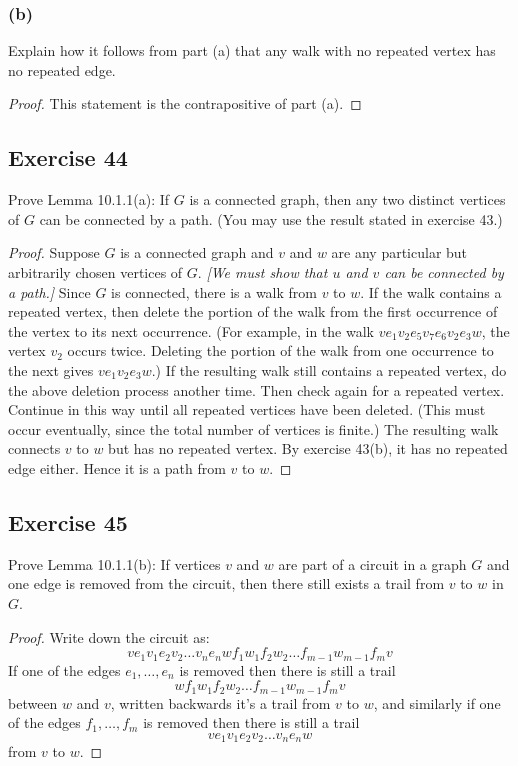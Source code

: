\documentclass[14pt]{extarticle}
\begin{document}
\subsubsection{(b)}
Explain how it follows from part (a) that any walk with no repeated vertex has no repeated edge.

\begin{proof}
    This statement is the contrapositive of part (a).
\end{proof}

\subsection{Exercise 44}
Prove Lemma 10.1.1(a): If \(G\) is a connected graph, then any two distinct vertices of \(G\) can be connected by a path.
(You may use the result stated in exercise 43.)

\begin{proof}
    Suppose \(G\) is a connected graph and \(v\) and \(w\) are any particular but arbitrarily chosen vertices of \(G\). {\it [We
                must show that \(u\) and \(v\) can be connected by a path.]} Since \(G\) is connected, there is a walk from \(v\) to \(w\).
    If the walk contains a repeated vertex, then delete the portion of the walk from the first occurrence of the vertex to
    its next occurrence. (For example, in the walk \(ve_1v_2e_5v_7e_6v_2e_3w\), the vertex \(v_2\) occurs twice.
    Deleting the portion of the walk from one occurrence to the next gives \(ve_1v_2e_3w\).) If the resulting walk still
    contains a repeated vertex, do the above deletion process another time. Then check again for a repeated vertex. Continue
    in this way until all repeated vertices have been deleted. (This must occur eventually, since the total number of
    vertices is finite.) The resulting walk connects \(v\) to \(w\) but has no repeated vertex. By exercise 43(b), it has no
    repeated edge either. Hence it is a path from \(v\) to \(w\).
\end{proof}

\subsection{Exercise 45}
Prove Lemma 10.1.1(b): If vertices \(v\) and \(w\) are part of a circuit in a graph \(G\) and one edge is removed from the
circuit, then there still exists a trail from \(v\) to \(w\) in \(G\).

\begin{proof}
    Write down the circuit as:
    \[
        ve_1v_1e_2v_2 \ldots v_ne_nwf_1w_1f_2w_2 \ldots f_{m-1}w_{m-1}f_mv
    \]
    If one of the edges \(e_1, \ldots, e_n\) is removed then there is still a trail
    \[
        wf_1w_1f_2w_2 \ldots f_{m-1}w_{m-1}f_mv
    \]
    between \(w\) and \(v\), written backwards it's a trail from \(v\) to \(w\), and similarly if one of the edges \(f_1, \ldots, f_m\) is removed then there is still a trail
    \[
        ve_1v_1e_2v_2 \ldots v_ne_nw
    \]
    from \(v\) to \(w\).
\end{proof}
\end{document}
